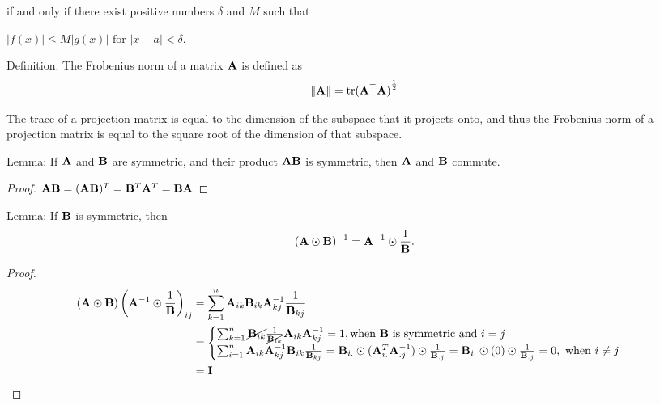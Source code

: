 \documentclass{amsart}[12pt]
\theoremstyle{definition}
\begin{document}
if and only if there exist positive numbers $\delta$ and $M$ such that

$|f(x)| \leq M |g(x)| \text{ for } |x - a| < \delta$.

Definition:
The Frobenius norm of a matrix ${\bf A}$ is defined as
\begin{align*}
	\| {\bf A} \| = \text{tr}{({\bf A}^\top {\bf A})}^{\frac{1}{2}} 
\end{align*}

The trace of a projection matrix is equal to the dimension of the subspace that it projects onto, and thus
the Frobenius norm of a projection matrix is equal to the square root of the dimension of that subspace.

Lemma:
If ${\bf A}$ and ${\bf B}$ are symmetric, and their product ${\bf A} {\bf B}$ is symmetric, then ${\bf A}$ and ${\bf B}$ commute.
\begin{proof}
	${\bf A} {\bf B} = ({\bf A} {\bf B})^T = {\bf B}^T {\bf A}^T = {\bf B} {\bf A}$
\end{proof}

Lemma:
If ${\bf B}$ is symmetric, then
\[
	({\bf A} \odot {\bf B})^{-1} = {\bf A}^{-1} \odot \frac{1}{{\bf B}}.
\]
\begin{proof}
	\begin{align*}
		({\bf A} \odot {\bf B})\left({\bf A}^{-1} \odot \frac{1}{{\bf B}}\right)_{ij} & = \sum_{k=1}^n {\bf A}_{ik} {\bf B}_{ik} {\bf A}^{-1}_{kj} \frac{1}{{\bf B}_{kj}} \\
		                                                              & =                                                                 
		\begin{cases}
		\sum_{k=1}^n \cancel{{\bf B}_{ik}} \frac{1}{\cancel{{\bf B}_{ik}}} {\bf A}_{ik} {\bf A}^{-1}_{kj} = 1, \text{when ${\bf B}$ is symmetric and $i = j$} \\
		\sum_{i=1}^n {\bf A}_{ik} {\bf A}^{-1}_{kj} {\bf B}_{ik} \frac{1}{{\bf B}_{kj}}
		= {\bf B}_{i.} \odot ({\bf A}^T_{i.} {\bf A}^{-1}_{.j}) \odot \frac{1}{{\bf B}_{.j}}
		= {\bf B}_{i.} \odot (0) \odot \frac{1}{{\bf B}_{.j}}
		= 0, \text{ when $i \ne j$}
		\end{cases}\\
		                                                              & = {\bf I}                                                             
	\end{align*}
\end{proof}
\end{document}
